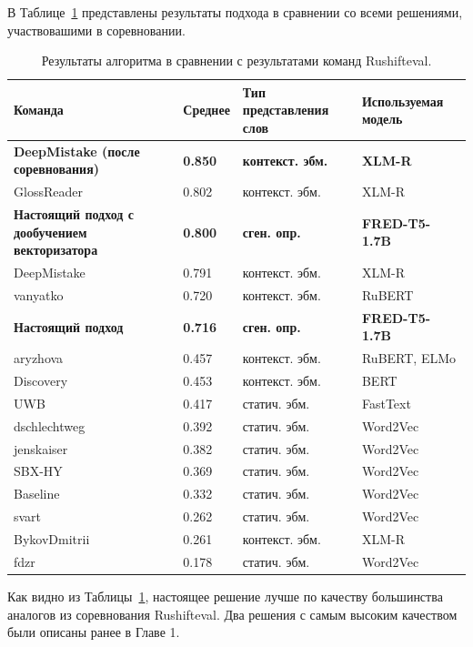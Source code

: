\documentclass[LI,VKR]{HSEUniversity}
\begin{document}
В Таблице~\ref{tab:Rushifteval all} представлены результаты подхода в сравнении со всеми решениями,
участвовашими в соревновании.

\begin{table}[H]
\centering
\caption{Результаты алгоритма в сравнении с результатами команд Rushifteval.}
\label{tab:Rushifteval all}
\begin{tabular}{|m{4cm}|m{2.5cm}|m{4cm}|m{3cm}|}
\hline
\textbf{Команда} & \textbf{Среднее} & \textbf{Тип представления слов} & \textbf{Используемая модель} \\
\hline
\textbf{DeepMistake (после соревнования)} & \textbf{0.850} & \textbf{контекст. эбм.} & \textbf{XLM-R} \\
\hline
GlossReader & 0.802 & контекст. эбм. & XLM-R \\
\hline
\textbf{Настоящий подход с дообучением векторизатора} & \textbf{0.800} & \textbf{сген. опр.} & \textbf{FRED-T5-1.7B} \\
\hline
DeepMistake & 0.791 & контекст. эбм. & XLM-R \\
\hline
vanyatko & 0.720 & контекст. эбм. & RuBERT \\
\hline
\textbf{Настоящий подход} & \textbf{0.716} & \textbf{сген. опр.} & \textbf{FRED-T5-1.7B} \\
\hline
aryzhova & 0.457 & контекст. эбм. & RuBERT, ELMo \\
\hline
Discovery & 0.453 & контекст. эбм. & BERT \\
\hline
UWB & 0.417 & статич. эбм. & FastText \\
\hline
dschlechtweg & 0.392 & статич. эбм. & Word2Vec \\
\hline
jenskaiser & 0.382 & статич. эбм. & Word2Vec \\
\hline
SBX-HY & 0.369 & статич. эбм. & Word2Vec \\
\hline
Baseline & 0.332 & статич. эбм. & Word2Vec \\
\hline
svart & 0.262 & статич. эбм. & Word2Vec \\
\hline
BykovDmitrii & 0.261 & контекст. эбм. & XLM-R \\
\hline
fdzr & 0.178 & статич. эбм. & Word2Vec \\
\hline
\end{tabular}
\end{table}

Как видно из Таблицы~\ref{tab:Rushifteval all}, настоящее решение лучше по качеству
большинства аналогов из соревнования Rushifteval.
Два решения с самым высоким качеством были описаны ранее в Главе 1.
\end{document}

